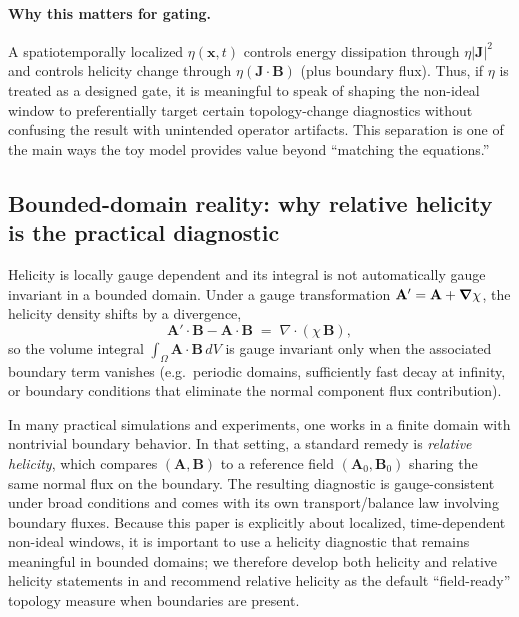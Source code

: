 \documentclass[11pt]{article}
\theoremstyle{plain}
\theoremstyle{definition}
\theoremstyle{remark}
\newcommand{\diver}{\nabla\cdot}
\newcommand{\A}{\mathbf{A}}
\newcommand{\B}{\mathbf{B}}
\newcommand{\J}{\mathbf{J}}
\begin{document}
\paragraph{Why this matters for gating.}
A spatiotemporally localized $\eta(\mathbf{x},t)$ controls energy dissipation through $\eta|\J|^2$ and
controls helicity change through $\eta(\J\cdot\B)$ (plus boundary flux). Thus, if $\eta$ is treated as a
designed gate, it is meaningful to speak of shaping the non-ideal window to preferentially target
certain topology-change diagnostics without confusing the result with unintended operator artifacts.
This separation is one of the main ways the toy model provides value beyond ``matching the equations.''

\subsection{Bounded-domain reality: why relative helicity is the practical diagnostic}\label{sec:background_relative_helicity}
Helicity is locally gauge dependent and its integral is not automatically gauge invariant in a bounded
domain. Under a gauge transformation $\A'=\A+\grad\chi$, the helicity density shifts by a divergence,
\begin{equation}\label{eq:gauge_shift_background}
  \A'\cdot\B - \A\cdot\B \;=\; \diver(\chi\,\B),
\end{equation}
so the volume integral $\int_{\Omega}\A\cdot\B\,dV$ is gauge invariant only when the associated boundary
term vanishes (e.g.\ periodic domains, sufficiently fast decay at infinity, or boundary conditions that
eliminate the normal component flux contribution).

In many practical simulations and experiments, one works in a finite domain with nontrivial boundary
behavior. In that setting, a standard remedy is \emph{relative helicity}, which compares $(\A,\B)$ to a
reference field $(\A_0,\B_0)$ sharing the same normal flux on the boundary. The resulting diagnostic is
gauge-consistent under broad conditions and comes with its own transport/balance law involving boundary
fluxes. Because this paper is explicitly about localized, time-dependent non-ideal windows, it is
important to use a helicity diagnostic that remains meaningful in bounded domains; we therefore develop
both helicity and relative helicity statements in  and recommend relative helicity
as the default ``field-ready'' topology measure when boundaries are present.

\end{document}
